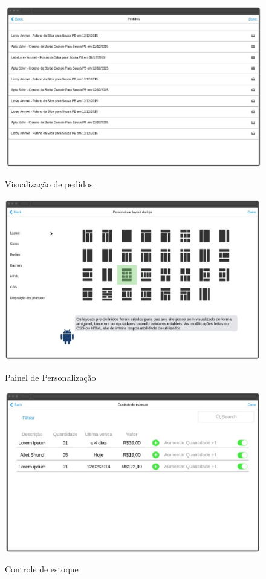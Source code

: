 \documentclass[a4paper,12pt]{monografia}
\begin{document}
\begin{figure}[H]
\centering
\caption{Visualização de pedidos}
\centering
\includegraphics[width=12cm]{img/prototipos/visualizacao-pedido.eps}\\
\label{figura:visualizacao_pedidos}
\end{figure}

\begin{figure}[H]
\centering
\caption{Painel de Personalização}
\centering
\includegraphics[width=12cm]{img/prototipos/painel-personalizacao.eps}\\
\label{figura:painel_personalizacao}
\end{figure}

\begin{figure}[H]
\centering
\caption{Controle de estoque}
\centering
\includegraphics[width=12cm]{img/prototipos/estoque.eps}\\
\label{figura:controle_estoque}
\end{figure}
\end{document}
